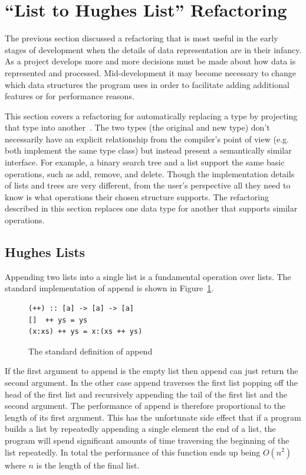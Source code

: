 \section{``List to Hughes List'' Refactoring}\label{listToDlist}

The previous section discussed a refactoring that is most useful in the early stages of development when the details of data representation are in their infancy. As a project develops more and more decisions must be made about how data is represented and processed. Mid-development it may become necessary to change which data structures the program uses in order to facilitate adding additional features or for performance reasons.

This section covers a refactoring for automatically replacing a type by projecting that type into another~\citep{galoisConnection}. The two types (the original and new type) don't necessarily have an explicit relationship from the compiler's point of view (e.g. both implement the same type class) but instead present a semantically similar interface. For example, a binary search tree and a list support the same basic operations, such as add, remove, and delete. Though the implementation details of lists and trees are very different, from the user's perspective all they need to know is what operations their chosen structure supports. The refactoring described in this section replaces one data type for another that supports similar operations.

\subsection{Hughes Lists}

Appending two lists into a single list is a fundamental operation over lists. The standard implementation of append is shown in Figure~\ref{append}.

\begin{figure}[t]
\begin{lstlisting}
(++) :: [a] -> [a] -> [a]
[]  ++ ys = ys
(x:xs) ++ ys = x:(xs ++ ys)
\end{lstlisting}
\caption{The standard definition of append}
\label{append}
\end{figure}

If the first argument to append is the empty list then append can just return the second argument. In the other case append traverses the first list popping off the head of the first list and recursively appending the tail of the first list and the second argument. The performance of append is therefore proportional to the length of its first argument. This has the unfortunate side effect that if a program builds a list by repeatedly appending a single element the end of a list, the program will spend significant amounts of time traversing the beginning of the list repeatedly. In total the performance of this function ends up being $O(n^2)$ where $n$ is the length of the final list.


